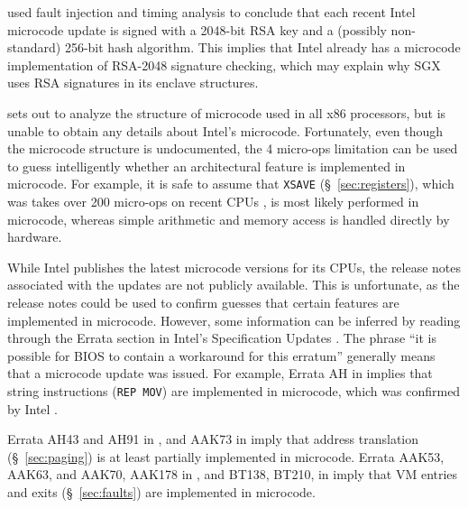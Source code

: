 \cite{hawkes2012microcode} used fault injection and timing analysis to conclude
that each recent Intel microcode update is signed with a 2048-bit RSA key and
a (possibly non-standard) 256-bit hash algorithm. This implies that Intel
already has a microcode implementation of RSA-2048 signature checking, which
may explain why SGX uses RSA signatures in its enclave structures.

\cite{chen2014microcode} sets out to analyze the structure of microcode used in
all x86 processors, but is unable to obtain any details about Intel's
microcode. Fortunately, even though the microcode structure is undocumented,
the 4 micro-ops limitation can be used to guess intelligently whether an
architectural feature is implemented in microcode. For example, it is safe to
assume that \texttt{XSAVE} (\S~\ref{sec:registers}), which was takes over 200
micro-ops on recent CPUs \cite{fog2014microops}, is most likely performed in
microcode, whereas simple arithmetic and memory access is handled directly by
hardware.

While Intel publishes the latest microcode versions for its CPUs, the release
notes associated with the updates are not publicly available. This is
unfortunate, as the release notes could be used to confirm guesses that certain
features are implemented in microcode. However, some information can be
inferred by reading through the Errata section in Intel's Specification Updates
\cite{intel2010errata, intel2015errata, intel2015errata2}. The phrase ``it is
possible for BIOS to contain a workaround for this erratum'' generally means
that a microcode update was issued. For example, Errata AH in
\cite{intel2010errata} implies that string instructions (\texttt{REP MOV}) are
implemented in microcode, which was confirmed by Intel
\cite{abraham2006repmov}.

Errata AH43 and AH91 in \cite{intel2010errata}, and AAK73 in
\cite{intel2015errata} imply that address translation (\S~\ref{sec:paging}) is
at least partially implemented in microcode. Errata AAK53, AAK63, and AAK70,
AAK178 in \cite{intel2015errata}, and BT138, BT210,  in \cite{intel2015errata2}
imply that VM entries and exits (\S~\ref{sec:faults}) are implemented in
microcode.
